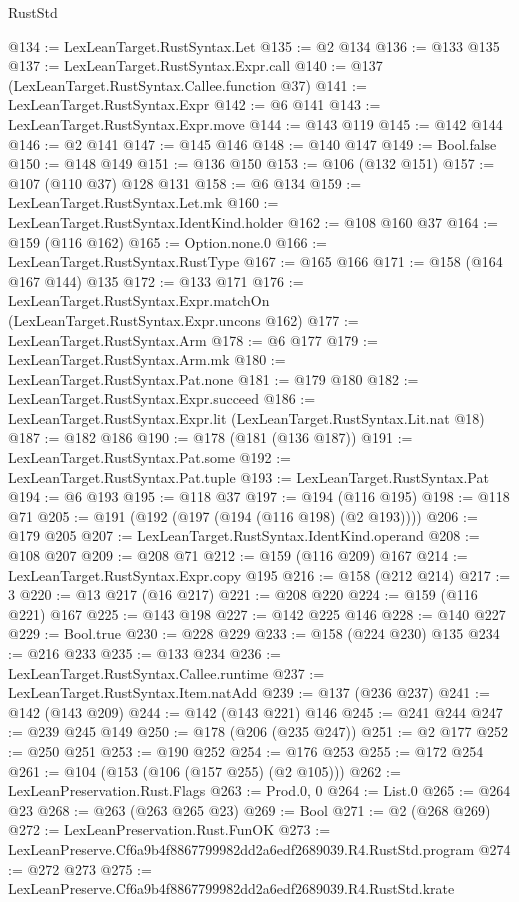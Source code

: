\begin{lexlean}{RustStd}
\begin{coremodule}
@134 := LexLeanTarget.RustSyntax.Let
@135 := @2 @134
@136 := @133 @135
@137 := LexLeanTarget.RustSyntax.Expr.call
@140 := @137 (LexLeanTarget.RustSyntax.Callee.function @37)
@141 := LexLeanTarget.RustSyntax.Expr
@142 := @6 @141
@143 := LexLeanTarget.RustSyntax.Expr.move
@144 := @143 @119
@145 := @142 @144
@146 := @2 @141
@147 := @145 @146
@148 := @140 @147
@149 := Bool.false
@150 := @148 @149
@151 := @136 @150
@153 := @106 (@132 @151)
@157 := @107 (@110 @37) @128 @131
@158 := @6 @134
@159 := LexLeanTarget.RustSyntax.Let.mk
@160 := LexLeanTarget.RustSyntax.IdentKind.holder
@162 := @108 @160 @37
@164 := @159 (@116 @162)
@165 := Option.none.{0}
@166 := LexLeanTarget.RustSyntax.RustType
@167 := @165 @166
@171 := @158 (@164 @167 @144) @135
@172 := @133 @171
@176 := LexLeanTarget.RustSyntax.Expr.matchOn (LexLeanTarget.RustSyntax.Expr.uncons @162)
@177 := LexLeanTarget.RustSyntax.Arm
@178 := @6 @177
@179 := LexLeanTarget.RustSyntax.Arm.mk
@180 := LexLeanTarget.RustSyntax.Pat.none
@181 := @179 @180
@182 := LexLeanTarget.RustSyntax.Expr.succeed
@186 := LexLeanTarget.RustSyntax.Expr.lit (LexLeanTarget.RustSyntax.Lit.nat @18)
@187 := @182 @186
@190 := @178 (@181 (@136 @187))
@191 := LexLeanTarget.RustSyntax.Pat.some
@192 := LexLeanTarget.RustSyntax.Pat.tuple
@193 := LexLeanTarget.RustSyntax.Pat
@194 := @6 @193
@195 := @118 @37
@197 := @194 (@116 @195)
@198 := @118 @71
@205 := @191 (@192 (@197 (@194 (@116 @198) (@2 @193))))
@206 := @179 @205
@207 := LexLeanTarget.RustSyntax.IdentKind.operand
@208 := @108 @207
@209 := @208 @71
@212 := @159 (@116 @209) @167
@214 := LexLeanTarget.RustSyntax.Expr.copy @195
@216 := @158 (@212 @214)
@217 := 3
@220 := @13 @217 (@16 @217)
@221 := @208 @220
@224 := @159 (@116 @221) @167
@225 := @143 @198
@227 := @142 @225 @146
@228 := @140 @227
@229 := Bool.true
@230 := @228 @229
@233 := @158 (@224 @230) @135
@234 := @216 @233
@235 := @133 @234
@236 := LexLeanTarget.RustSyntax.Callee.runtime
@237 := LexLeanTarget.RustSyntax.Item.natAdd
@239 := @137 (@236 @237)
@241 := @142 (@143 @209)
@244 := @142 (@143 @221) @146
@245 := @241 @244
@247 := @239 @245 @149
@250 := @178 (@206 (@235 @247))
@251 := @2 @177
@252 := @250 @251
@253 := @190 @252
@254 := @176 @253
@255 := @172 @254
@261 := @104 (@153 (@106 (@157 @255) (@2 @105)))
@262 := LexLeanPreservation.Rust.Flags
@263 := Prod.{0, 0}
@264 := List.{0}
@265 := @264 @23
@268 := @263 (@263 @265 @23)
@269 := Bool
@271 := @2 (@268 @269)
@272 := LexLeanPreservation.Rust.FunOK
@273 := LexLeanPreserve.Cf6a9b4f8867799982dd2a6edf2689039.R4.RustStd.program
@274 := @272 @273
@275 := LexLeanPreserve.Cf6a9b4f8867799982dd2a6edf2689039.R4.RustStd.krate

\end{coremodule}
\end{lexlean}
